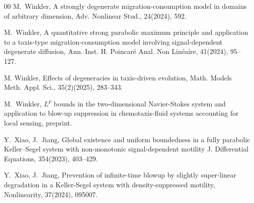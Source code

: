 \documentclass[12pt]{article}
\theoremstyle{plain}
\theoremstyle{definition}
\numberwithin{equation}{section}
\begin{document}
\begin{thebibliography}{00}
M.~Winkler, A strongly degenerate migration-consumption model in domains of arbitrary dimension,  Adv. Nonlinear Stud., 24(2024),
592.

 M.~Winkler,
 A quantitative strong parabolic maximum principle and application to a taxis-type migration-consumption model involving signal-dependent degenerate diffusion, Ann. Inst. H. Poincar\'{e}  Anal. Non Lin\'{e}aire, 41(2024), 95--127.

M. Winkler, Effects of degeneracies in taxis-driven evolution, Math. Models Meth. Appl. Sci., 35(2)(2025), 283--343.

 M.~Winkler,
  $L^p$  bounds in the two-dimensional Navier-Stokes system
and application to blow-up suppression in chemotaxis-fluid systems accounting for local sensing, preprint.

Y.~Xiao, J.~Jiang,
Global existence and uniform boundedness in a fully parabolic Keller--Segel system with non-monotonic signal-dependent motility
J. Differential Equations, 354(2023), 403--429.

Y.~Xiao, J.~Jiang,
  Prevention of infinite-time blowup by slightly super-linear degradation in a Keller-Segel system with density-suppressed motility, Nonlinearity, 37(2024), 095007.

\end{thebibliography}
\end{document}

